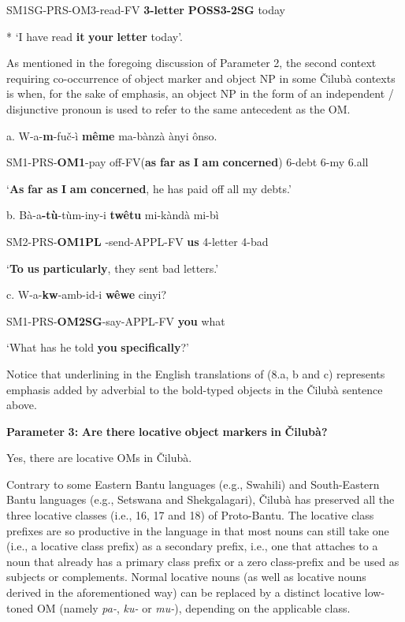 \documentclass[output=paper]{langscibook}
\begin{document}
      SM1SG-PRS-OM3-read-FV  \textbf{3-letter}      \textbf{POSS3-2SG}    today

* ‘I have read \textbf{it} \textbf{your} \textbf{letter} today’.

As mentioned in the foregoing discussion of Parameter 2, the second context requiring co-occurrence of object marker and object NP in some Čilubà contexts is when, for the sake of emphasis, an object NP in the form of an independent / disjunctive pronoun is used to refer to the same antecedent as the OM.

\ea%
    \label{ex:lukusa:8}
    \z

            a.  W-a-\textbf{m}{}-fuč-ì               \textbf{même}            ma-bànzà  ànyi    ônso.

      SM1-PRS-\textbf{OM1}{}-pay off-FV(\textbf{as} \textbf{far} \textbf{as} \textbf{I} \textbf{am} \textbf{concerned})    6-debt    6-my    6.all

\glt ‘\textbf{As} \textbf{far} \textbf{as} \textbf{I} \textbf{am} \textbf{concerned}, he  has paid off all my debts.’

b.  Bà-a\textbf{{}-tù}{}-tùm-iny-i              \textbf{twêtu}    mi-kàndà    mi-bì

      SM2-PRS-\textbf{OM1PL}  {}-send-APPL-FV  \textbf{us}        4-letter      4-bad

\glt ‘\textbf{To} \textbf{us} \textbf{particularly}, they sent bad letters.’

c.  W-a-\textbf{kw}{}-amb-id-i             \textbf{wêwe}   cinyi?

      SM1-PRS-\textbf{OM2SG}{}-say-APPL-FV    \textbf{you}    what

\glt ‘What has he told \textbf{you} \textbf{specifically}?’

Notice that underlining in the English translations of (8.a, b and c) represents emphasis added by adverbial to the bold-typed objects in the Čilubà sentence above.

\textbf{Parameter} \textbf{3:} \textbf{Are} \textbf{there} \textbf{locative} \textbf{object} \textbf{markers} \textbf{in} \textbf{Čilubà?}

Yes, there are locative OMs in Čilubà.

Contrary to some Eastern Bantu languages (e.g., Swahili) and South-Eastern Bantu languages (e.g., Setswana and Shekgalagari), Čilubà has preserved all the three locative classes (i.e., 16, 17 and 18) of Proto-Bantu. The locative class prefixes are so productive in the language in that most nouns can still take one (i.e., a locative class prefix) as a secondary prefix, i.e., one that attaches to a noun that already has a primary class prefix or a zero class-prefix and be used as subjects or complements. Normal locative nouns (as well as locative nouns derived in the aforementioned way) can be replaced by a distinct locative low-toned OM (namely \textit{pa-}, \textit{ku-} or \textit{mu-}), depending on the applicable class.
\end{document}
